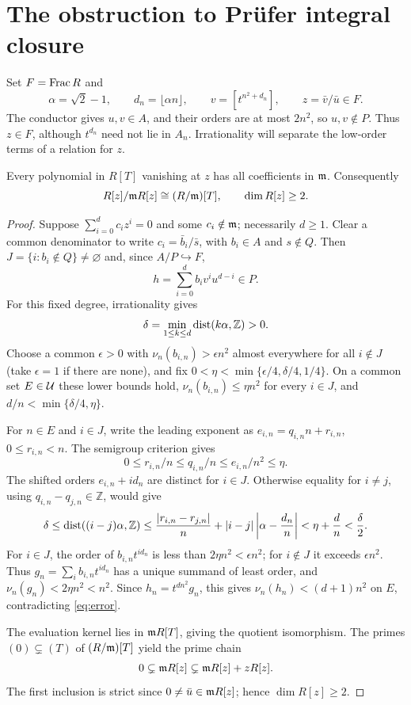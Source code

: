 \section{The obstruction to Pr\"ufer integral closure}\label{sec:obstruction}

Set $F=\operatorname{Frac} R$ and
\[
 \alpha=\sqrt2-1,\qquad d_n=\lfloor\alpha n\rfloor,\qquad
 v=[t^{n^2+d_n}],\qquad z=\bar v/\bar u\in F.
\]
The conductor gives $u,v\in A$, and their orders are at most $2n^2$,
so $u,v\notin P$. Thus $z\in F$, although $t^{d_n}$ need not lie in
$A_n$. Irrationality will separate the low-order terms of a relation
for $z$.

\begin{lemma}\label{lem:separation}
Every polynomial in $R[T]$ vanishing at $z$ has all coefficients in
$\mathfrak m$. Consequently
\[
 R[z]/\mathfrak m R[z]\cong(R/\mathfrak m)[T],\qquad \dim R[z]\geq2.
\]
\end{lemma}
\begin{proof}
Suppose $\sum_{i=0}^d c_i z^i=0$ and some $c_i\notin\mathfrak m$;
necessarily $d\geq1$. Clear a common denominator to write
$c_i=\bar b_i/\bar s$, with $b_i\in A$ and $s\notin Q$.
Then $J=\{i:b_i\notin Q\}\ne\varnothing$ and, since
$A/P\hookrightarrow F$,
\begin{equation}\label{eq:error}
 h=\sum_{i=0}^d b_i v^i u^{d-i}\in P.
\end{equation}
For this fixed degree, irrationality gives
\[
 \delta=\min_{1\leq k\leq d}\operatorname{dist}(k\alpha,\mathbb Z)>0.
\]
Choose a common $\epsilon>0$ with
$\nu_n(b_{i,n})>\epsilon n^2$ almost everywhere for all $i\notin J$
(take $\epsilon=1$ if there are none), and fix
$0<\eta<\min\{\epsilon/4,\delta/4,1/4\}$.
On a common set $E\in\mathcal U$ these lower bounds hold,
$\nu_n(b_{i,n})\leq\eta n^2$ for every $i\in J$, and
$d/n<\min\{\delta/4,\eta\}$.

For $n\in E$ and $i\in J$, write the leading exponent as
$e_{i,n}=q_{i,n}n+r_{i,n}$, $0\leq r_{i,n}<n$.
The semigroup criterion gives
\[
 0\leq r_{i,n}/n\leq q_{i,n}/n\leq e_{i,n}/n^2\leq\eta.
\]
The shifted orders $e_{i,n}+id_n$ are distinct for $i\in J$.
Otherwise equality for $i\ne j$, using
$q_{i,n}-q_{j,n}\in\mathbb Z$, would give
\[
 \delta\leq\operatorname{dist}((i-j)\alpha,\mathbb Z)
 \leq\frac{|r_{i,n}-r_{j,n}|}{n}
      +|i-j|\left|\alpha-\frac{d_n}{n}\right|
 <\eta+\frac dn<\frac\delta2.
\]
For $i\in J$, the order of $b_{i,n}t^{id_n}$ is less than
$2\eta n^2<\epsilon n^2$; for $i\notin J$ it exceeds
$\epsilon n^2$. Thus $g_n=\sum_i b_{i,n}t^{id_n}$ has a unique
summand of least order, and $\nu_n(g_n)<2\eta n^2<n^2$.
Since $h_n=t^{dn^2}g_n$, this gives
$\nu_n(h_n)<(d+1)n^2$ on $E$, contradicting \eqref{eq:error}.

The evaluation kernel lies in $\mathfrak m R[T]$, giving the quotient
isomorphism. The primes $(0)\subsetneq(T)$ of $(R/\mathfrak m)[T]$ yield
the prime chain
\[
 0\subsetneq\mathfrak m R[z]\subsetneq\mathfrak m R[z]+zR[z].
\]
The first inclusion is strict since $0\ne\bar u\in\mathfrak m R[z]$;
hence $\dim R[z]\geq2$.
\end{proof}

